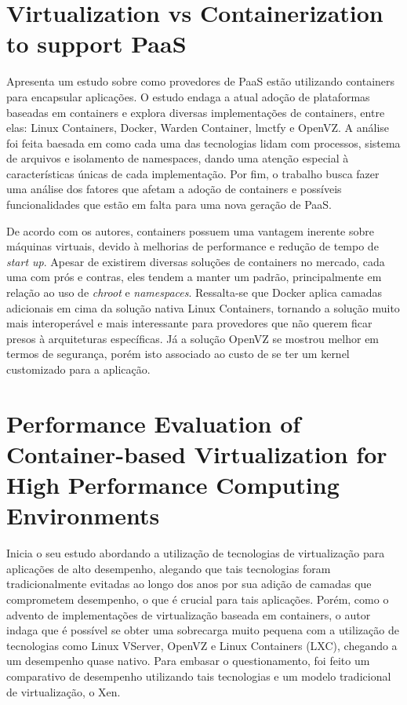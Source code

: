 \documentclass[twoside,english,brazilian]{UNISINOSmonografia}
\begin{document}
\section{Virtualization vs Containerization to support PaaS}
\cite{Dua2014} Apresenta um estudo sobre como provedores de PaaS estão utilizando containers para encapsular aplicações. O estudo endaga a atual adoção de plataformas baseadas em containers e explora diversas implementações de containers, entre elas: Linux Containers, Docker, Warden Container, lmctfy e OpenVZ. A análise foi feita baesada em como cada uma das tecnologias lidam com processos, sistema de arquivos e isolamento de namespaces, dando uma atenção especial à características únicas de cada implementação. Por fim, o trabalho busca fazer uma análise dos fatores que afetam a adoção de containers e possíveis funcionalidades que estão em falta para uma nova geração de PaaS.

De acordo com os autores, containers possuem uma vantagem inerente sobre máquinas virtuais, devido à melhorias de performance e redução de tempo de \textit{start up}. Apesar de existirem diversas soluções de containers no mercado, cada uma com prós e contras, eles tendem a manter um padrão, principalmente em relação ao uso de \textit{chroot} e \textit{namespaces}. Ressalta-se que Docker aplica camadas adicionais em cima da solução nativa Linux Containers, tornando a solução muito mais interoperável e mais interessante para provedores que não querem ficar presos à arquiteturas específicas. Já a solução OpenVZ se mostrou melhor em termos de segurança, porém isto associado ao custo de se ter um kernel customizado para a aplicação.

\section{Performance Evaluation of Container-based Virtualization for High Performance Computing Environments}
\cite{Xavier2013} Inicia o seu estudo abordando a utilização de tecnologias de virtualização para aplicações de alto desempenho, alegando que tais tecnologias foram tradicionalmente evitadas ao longo dos anos por sua adição de camadas que comprometem desempenho, o que é crucial para tais aplicações. Porém, como o advento de implementações de virtualização baseada em containers, o autor indaga que é possível se obter uma sobrecarga muito pequena com a utilização de tecnologias como Linux VServer, OpenVZ e Linux Containers (LXC), chegando a um desempenho quase nativo. Para embasar o questionamento, foi feito um comparativo de desempenho utilizando tais tecnologias e um modelo tradicional de virtualização, o Xen. 
\end{document}
